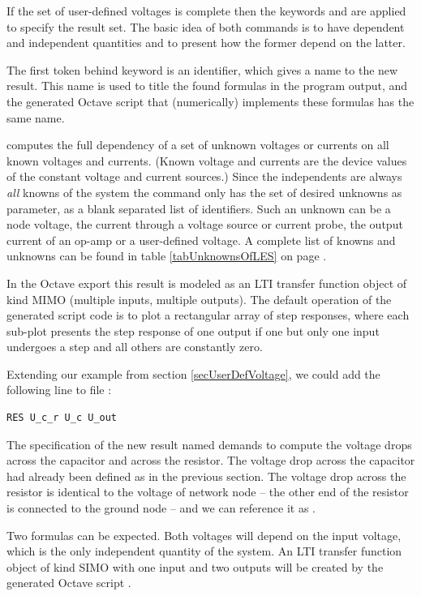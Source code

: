 If the set of user-defined voltages is complete then the keywords
 and  are applied to specify the result set. The
basic idea of both commands is to have dependent and independent
quantities and to present how the former depend on the latter.

The first token behind keyword  is an identifier, which gives a
name to the new result. This name is used to title the found formulas in
the program output, and the generated Octave script that (numerically)
implements these formulas has the same name.

 computes the full dependency of a set of unknown voltages or
currents on all known voltages and currents. (Known voltage and currents
are the device values of the constant voltage and current sources.) Since
the independents are always \emph{all} knowns of the system the command
only has the set of desired unknowns as parameter, as a blank separated
list of identifiers. Such an unknown can be a node voltage, the current
through a voltage source or current probe, the output current of an op-amp
or a user-defined voltage. A complete list of knowns and unknowns can be
found in table \ref{tabUnknownsOfLES} on page \pageref{tabUnknownsOfLES}.

In the Octave export this result is modeled as an LTI transfer function
object of kind MIMO (multiple inputs, multiple outputs). The default
operation of the generated script code is to plot a rectangular array of
step responses, where each sub-plot presents the step response of one
output if one but only one input undergoes a step and all others are
constantly zero.

Extending our example from section \ref{secUserDefVoltage}, we could add
the following line to file :

\begin{verbatim}
RES U_c_r U_c U_out
\end{verbatim}

The specification of the new result named  demands to
compute the voltage drops across the capacitor and across the resistor.
The voltage drop across the capacitor had already been defined as
 in the previous section. The voltage drop across the resistor
is identical to the voltage of network node  -- the other end of
the resistor is connected to the ground node -- and we can reference it as
.

Two formulas can be expected. Both voltages will depend on the input
voltage, which is the only independent quantity of the system. An LTI
transfer function object of kind SIMO with one input and two outputs will
be created by the generated Octave script . 


